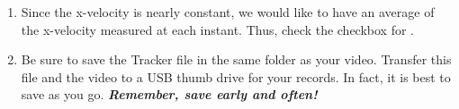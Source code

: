 \begin{enumerate}
	\item Since the x-velocity is nearly constant, we would like to have an average of the x-velocity measured at each instant. Thus, check the checkbox for .
	
	

	\item Be sure to save the Tracker file in the same folder as your video. Transfer this file and the video to a USB thumb drive for your records. In fact, it is best to save as you go. {\bf \emph{Remember, save early and often!}}
	
\end{enumerate}

\report

